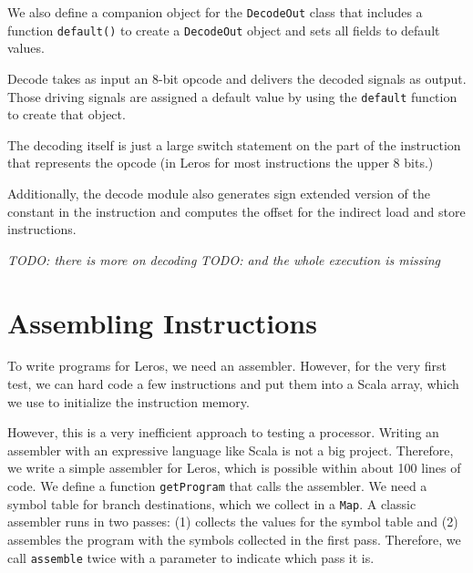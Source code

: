 \documentclass[%
    10pt,
    headinclude, footexclude,
    openright, %
    notitlepage,
    cleardoubleempty,
    headsepline,
    pointlessnumbers,
    bibtotoc, idxtotoc,
    ]{scrbook}
\newcommand{\code}[1]{{\lstinline[basicstyle=\small\ttfamily]{#1}}}
\newcommand{\todo}[1]{{\emph{TODO: #1}}}
\begin{document}

\noindent We also define a companion object for the \code{DecodeOut} class that includes a
function \code{default()} to create a \code{DecodeOut} object and sets all fields to
default values.
 

\noindent Decode takes as input an 8-bit opcode and delivers the decoded signals
as output. Those driving signals are assigned a default value by using the \code{default}
function to create that object.


\noindent The decoding itself is just a large switch statement on the part of the
instruction that represents the opcode (in Leros for most instructions the upper
8 bits.)


Additionally, the decode module also generates sign extended version of the
constant in the instruction and computes the offset for the indirect load and
store instructions.

\todo{there is more on decoding}
\todo{and the whole execution is missing}

\section{Assembling Instructions}


To write programs for Leros, we need an assembler. However, for the very first
test, we can hard code a few instructions and put them into a Scala array,
which we use to initialize the instruction memory.


\noindent However, this is a very inefficient approach to testing a processor.
Writing an assembler with an expressive language like Scala is not a big project.
Therefore, we write a simple assembler for Leros, which is possible within about
100 lines of code. We define a function \code{getProgram} that calls the assembler.
We need a symbol table for branch destinations, which we collect in a \code{Map}.
A classic assembler runs in two passes: (1) collects the values for the symbol table
and (2) assembles the program with the symbols collected in the first pass.
Therefore, we call \code{assemble} twice with a parameter to indicate which pass it is.
\end{document}
